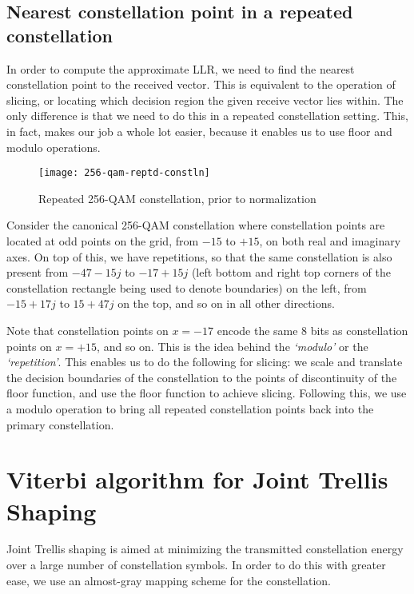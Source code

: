 \subsection{Nearest constellation point in a repeated constellation}

In order to compute the approximate LLR, we need to find the nearest
constellation point to the received vector. This is equivalent to the operation
of slicing, or locating which decision region the given receive vector lies
within. The only difference is that we need to do this in a repeated
constellation setting. This, in fact, makes our job a whole lot easier, because
it enables us to use floor and modulo operations.

\begin{figure}[h]
	\centering
	\texttt{[image: 256-qam-reptd-constln]}
	\caption{Repeated 256-QAM constellation, prior to normalization}
	\label{fig:256-qam-reptd}
\end{figure}

Consider the canonical 256-QAM constellation where constellation points are
located at odd points on the grid, from $-15$ to $+15$, on both real and
imaginary axes. On top of this, we have repetitions, so that the same
constellation is also present from $-47-15j$ to $-17+15j$ (left bottom and
right top corners of the constellation rectangle being used to denote
boundaries) on the left, from $-15+17j$ to $15+47j$ on the top, and so on in
all other directions.

Note that constellation points on $x=-17$ encode the same 8 bits as
constellation points on $x=+15$, and so on. This is the idea behind the
\emph{`modulo'} or the \emph{`repetition'}. This enables us to do the following
for slicing: we scale and translate the decision boundaries of the
constellation to the points of discontinuity of the floor function, and use the
floor function to achieve slicing. Following this, we use a modulo operation to
bring all repeated constellation points back into the primary constellation.



\section{Viterbi algorithm for Joint Trellis Shaping}

Joint Trellis shaping is aimed at minimizing the transmitted constellation
energy over a large number of constellation symbols. In order to do this with
greater ease, we use an almost-gray mapping scheme for the constellation.

